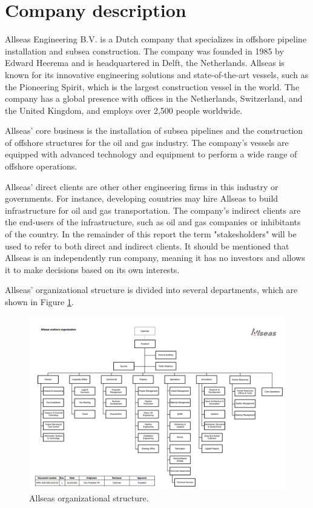 \section{Company description}\label{sec:company}
Allseas Engineering B.V. is a Dutch company that specializes in offshore pipeline
installation and subsea construction. The company was founded in 1985 by Edward Heerema
and is headquartered in Delft, the Netherlands. Allseas is known for its innovative
engineering solutions and state-of-the-art vessels, such as the Pioneering Spirit,
which is the largest construction vessel in the world.
The company has a global presence with offices in the Netherlands, Switzerland,
and the United Kingdom, and employs over 2,500 people worldwide.

Allseas' core business is the installation of subsea pipelines and the
construction of offshore structures for the oil and gas industry. The company's
vessels are equipped with advanced technology and equipment to perform a wide
range of offshore operations. \cite{allseas}

Allseas' direct clients are other other engineering firms in this industry or governments. For instance, developing countries may hire Allseas to build infrastructure for oil and gas transportation. The company's indirect clients are the end-users of the infrastructure, such as oil and gas companies or inhibitants of the country. In the remainder of this report the term "stakesholders" will be used to refer to both direct and indirect clients. It should be mentioned that Allseas is an independently run company, meaning it has no investors and allows it to make decisions based on its own interests.

Allseas' organizational structure is divided into several departments, which
are shown in Figure \ref{fig:allseas_org}.
\begin{figure}[H]
    \centering
    \includegraphics[width=\textwidth]{images/allseas_organisation.png}
    \caption{Allseas organizational structure.}
    \label{fig:allseas_org}
\end{figure}

